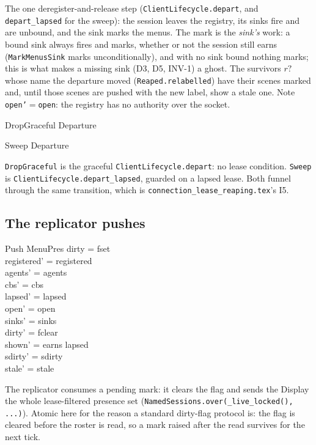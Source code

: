 \documentclass[a4paper,10pt,fleqn]{article}
\begin{document}
The one deregister-and-release step (\texttt{ClientLifecycle.depart}, and
\texttt{depart\_lapsed} for the sweep): the session leaves the registry, its
sinks fire and are unbound, and the sink marks the menus. The mark is the
\emph{sink's} work: a bound sink always fires and marks, whether or not the
session still earns (\texttt{MarkMenusSink} marks unconditionally), and with no
sink bound nothing marks; this is what makes a missing sink (D3, D5, INV-1) a
ghost. The survivors $r?$ whose name the
departure moved (\texttt{Reaped.relabelled}) have their scenes marked and, until
those scenes are pushed with the new label, show a stale one. Note
\texttt{open'}$=$\texttt{open}: the registry has no authority over the socket.

\begin{zed}
  DropGraceful  Departure
\end{zed}

\begin{zed}
  Sweep  Departure 
\end{zed}

\texttt{DropGraceful} is the graceful \texttt{ClientLifecycle.depart}: no lease
condition. \texttt{Sweep} is \texttt{ClientLifecycle.depart\_lapsed}, guarded on
a lapsed lease. Both funnel through the same transition, which is
\texttt{connection\_lease\_reaping.tex}'s I5.

\subsection{The replicator pushes}

\begin{schema}{Push}
  \Delta MenuPres
\where
  dirty = fset \\
  registered' = registered \\
  agents' = agents \\
  cbs' = cbs \\
  lapsed' = lapsed \\
  open' = open \\
  sinks' = sinks \\
  dirty' = fclear \\
  shown' = earns \setminus lapsed \\
  sdirty' = sdirty \\
  stale' = stale
\end{schema}

The replicator consumes a pending mark: it clears the flag and sends the
Display the whole lease-filtered presence set
(\texttt{NamedSessions.over(\_live\_locked(), ...)}). Atomic here for the reason a standard
dirty-flag protocol is: the flag is cleared before the roster is read, so a
mark raised after the read survives for the next tick.
\end{document}
